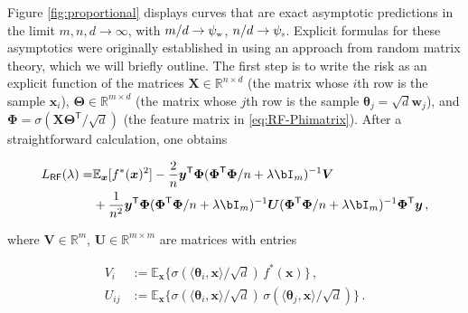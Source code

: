Figure \ref{fig:proportional} displays curves that are exact asymptotic predictions in the limit $m,n,d\to\infty$,
with $m/d\to\psi_{\mbox{\rm\tiny w}}$, $n/d\to\psi_{\mbox{\rm\tiny s}}$. Explicit formulas for these asymptotics were originally established in \cite{mei2019generalization} using an approach from random matrix theory, which we will briefly outline. The first step is to write the risk as an explicit function of the matrices ${\boldsymbol X}\in{\mathbb R}^{n\times d}$ (the matrix whose $i$th row is the sample ${\boldsymbol x}_i$),
${\boldsymbol \Theta}\in{\mathbb R}^{m\times d}$ (the matrix whose $j$th row is the sample ${\boldsymbol \theta}_j=\sqrt{d}{\boldsymbol w}_j$), and
${\boldsymbol \Phi} = \sigma({\boldsymbol X}{\boldsymbol \Theta}^{{\mathsf T}}/\sqrt{d})$ (the feature matrix in \eqref{eq:RF-Phimatrix}). After a straightforward calculation, one obtains

\begin{align}
  {L}_{{\sf RF}}(\lambda) =&\mathbb{E}_{{\boldsymbol x}}[f^*({\boldsymbol x})^2] - \frac{2}{n} {\boldsymbol y}^{\mathsf T} {\boldsymbol \Phi}({\boldsymbol \Phi}^{{\mathsf T}}{\boldsymbol \Phi}/n+\lambda\bI_m)^{-1} {\boldsymbol V}  \label{eq:ExplicitRisk}\\
  &+  \frac{1}{n^2}{\boldsymbol y}^{\mathsf T} {\boldsymbol \Phi}({\boldsymbol \Phi}^{{\mathsf T}}{\boldsymbol \Phi}/n+\lambda\bI_m)^{-1} {\boldsymbol U} ({\boldsymbol \Phi}^{{\mathsf T}}{\boldsymbol \Phi}/n+\lambda\bI_m)^{-1}  {\boldsymbol \Phi}^{\mathsf T} {\boldsymbol y} \, ,\nonumber
\end{align}

where  ${\boldsymbol V}\in{\mathbb R}^m$, ${\boldsymbol U}\in{\mathbb R}^{m\times m}$ are matrices with entries

\begin{align}

  V_i &:= \mathbb{E}_{{\boldsymbol x}}\{\sigma(\langle{\boldsymbol \theta}_i,{\boldsymbol x}\rangle/\sqrt{d})\, f^*({\boldsymbol x})\}\, ,\\
  U_{ij}&:=\mathbb{E}_{{\boldsymbol x}}\{\sigma(\langle{\boldsymbol \theta}_i,{\boldsymbol x}\rangle/\sqrt{d})\, \sigma(\langle{\boldsymbol \theta}_j,{\boldsymbol x}\rangle/\sqrt{d})\}\, .

\end{align}

